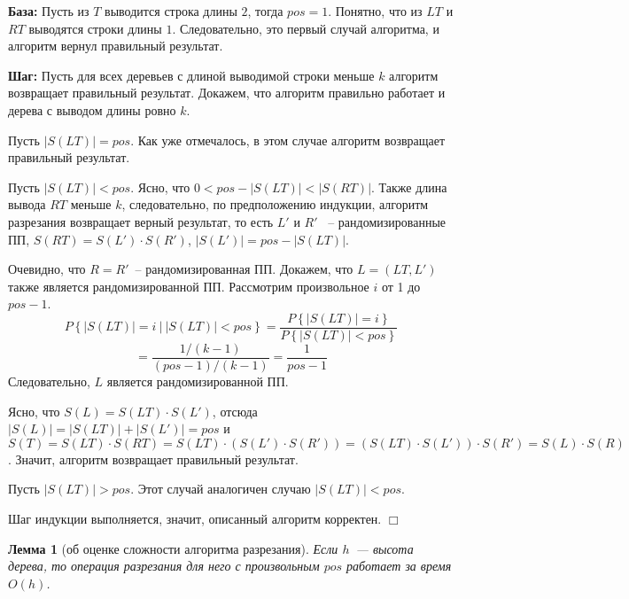\documentclass[14pt]{article}
\newtheorem{lemma}{Лемма}[section]
\begin{document}
{\bf База:} Пусть из $T$ выводится строка длины $2$, тогда $pos = 1$. Понятно,
что из $LT$ и $RT$ выводятся строки длины $1$. Следовательно, это первый
случай алгоритма, и алгоритм вернул правильный результат.

{\bf Шаг:} Пусть для всех деревьев с длиной выводимой строки меньше $k$
алгоритм возвращает правильный результат. Докажем, что алгоритм правильно работает
и дерева с выводом длины ровно $k$.

\begin{enumerate}
	\begin{item}
		Пусть $\left|S(LT)\right| = pos$. Как уже отмечалось, в этом случае алгоритм возвращает
		правильный результат.
	\end{item} 
	\begin{item}
		Пусть $\left|S(LT)\right| < pos$. Ясно, что $0 < pos - \left|S(LT)\right| < \left|S(RT)\right|$. Также длина вывода $RT$
		меньше $k$, следовательно, по предположению индукции, алгоритм разрезания возвращает верный результат,
		то есть $L'$ и $R'$ ~-- рандомизированные ПП, $S(RT) = S(L') \cdot S(R')$, $\left|S(L')\right| = pos - \left|S(LT)\right|$.

		Очевидно, что $R = R'$~-- рандомизированная ПП. Докажем, что $L = (LT, L')$ также является рандомизированной ПП.
		Рассмотрим произвольное $i$ от 1 до $pos-1$.
		$$P\left\{\left|S(LT)\right|=i~|~\left|S(LT)\right| < pos\right\} = \dfrac{P\left\{\left|S(LT)\right| = i\right\}}{P\left\{\left|S(LT)\right| < pos\right\}} $$
		$$= \dfrac{1/(k-1)}{(pos-1)/(k-1)} = \dfrac{1}{pos-1}$$
		Следовательно, $L$ является рандомизированной ПП.

		Ясно, что $S(L) = S(LT) \cdot S(L')$, отсюда $\left|S(L)\right| = \left|S(LT)\right| + \left|S(L')\right| = pos$ и
		$S(T) = S(LT) \cdot S(RT) = S(LT) \cdot (S(L') \cdot S(R')) = (S(LT) \cdot S(L')) \cdot S(R')
		= S(L) \cdot S(R)$. Значит, алгоритм возвращает правильный результат.
	\end{item}
	\begin{item}
		Пусть $\left|S(LT)\right| > pos$. Этот случай аналогичен случаю $\left|S(LT)\right| < pos$.
	\end{item}
\end{enumerate}

Шаг индукции выполняется, значит, описанный алгоритм корректен. $\Box$

\begin{lemma}[об оценке сложности алгоритма разрезания]
	Если $h$~--- высота дерева, то операция разрезания для него с произвольным $pos$
	работает за время $O(h)$. 
\end{lemma}
\end{document}
